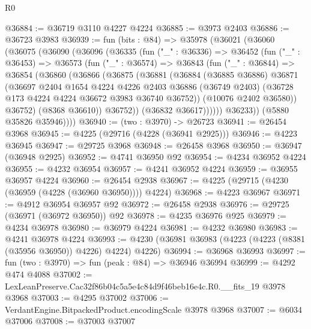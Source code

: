 \begin{lexlean}{R0}
\begin{coremodule}
@36884 := @36719 @3110 @4227 @4224
@36885 := @3973 @2403
@36886 := @36723 @3983
@36939 := fun (bits : @84) =>
  @35978
    (@36021
      (@36060
        (@36075
          (@36090
            (@36096
              (@36335
                (fun ("_" : @36336) =>
                @36452
                  (fun ("_" : @36453) =>
                  @36573
                    (fun ("_" : @36574) =>
                    @36843
                      (fun ("_" : @36844) =>
                      @36854
                        (@36860
                          (@36866
                            (@36875
                              (@36881
                                (@36884
                                  (@36885 @36886)
                                  @36871
                                  (@36697
                                    @2404
                                    @1654
                                    @4224
                                    @4226
                                    @2403
                                    @36886
                                    (@36749 @2403)
                                    (@36728 @173 @4224 @4224 @36672 @3983 @36740 @36752))
                                  (@10076 @2402 @36580))
                                @36752)
                              (@8368 @36610))
                            @36752))
                        (@36832 @36617))))))
              @36233))
          (@5880 @35826 @35946))))
@36940 := (two : @3970) -> @26723
@36941 := @26454 @3968
@36945 := @4225 (@29716 (@4228 (@36941 @2925)))
@36946 := @4223 @36945
@36947 := @29725 @3968
@36948 := @26458 @3968
@36950 := @36947 (@36948 @2925)
@36952 := @4741 @36950 @92
@36954 := @4234 @36952 @4224
@36955 := @4232 @36954
@36957 := @4241 @36952 @4224
@36959 := @36955 @36957 @4224
@36960 := @26454 @2938
@36967 := @4225 (@29715 (@4230 (@36959 (@4228 (@36960 @36950)))) @4224)
@36968 := @4223 @36967
@36971 := @4912 @36954 @36957 @92
@36972 := @26458 @2938
@36976 := @29725 (@36971 (@36972 @36950)) @92
@36978 := @4235 @36976 @925
@36979 := @4234 @36978
@36980 := @36979 @4224
@36981 := @4232 @36980
@36983 := @4241 @36978 @4224
@36993 := @4230 (@36981 @36983 (@4223 (@4223 (@8381 (@35956 @36950)) @4226) @4224) @4226)
@36994 := @36968 @36993
@36997 := fun (two : @3970) => fun (peak : @84) => @36946 @36994
@36999 := @4292 @474 @4088
@37002 := LexLeanPreserve.Cac32f86b04c5a5e4c84d9f46beb16e4c.R0.__fits_19 @3978 @3968
@37003 := @4295 @37002
@37006 := VerdantEngine.BitpackedProduct.encodingScale @3978 @3968
@37007 := @6034 @37006
@37008 := @37003 @37007

\end{coremodule}
\end{lexlean}
